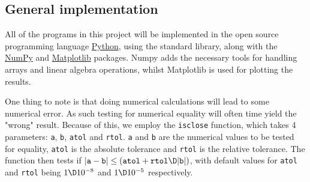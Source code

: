 \documentclass[main.tex]{subfiles}
\begin{document}
	
	
	\subsection{General implementation}
	All of the programs in this project will be implemented in the open source programming language \href{www.python.org}{Python}, using the standard library, along with the \href{www.numpy.org}{NumPy} and \href{www.matplotlib.org}{Matplotlib} packages. Numpy adds the necessary tools for handling arrays and linear algebra operations, whilst Matplotlib is used for plotting the results.
	
	One thing to note is that doing numerical calculations will lead to some numerical error. As such testing for numerical equality will often time yield the "wrong" result. Because of this, we employ the \texttt{isclose} function, which takes 4 parameters: \texttt{a}, \texttt{b}, \texttt{atol} and \texttt{rtol}. \texttt{a} and \texttt{b} are the numerical values to be tested for equality, \texttt{atol} is the absolute tolerance and \texttt{rtol} is the relative tolerance. The function then tests if $|\texttt{a}-\texttt{b}| \leq (\texttt{atol}+ \texttt{rtol} \D |\texttt{b}|)$, with default values for \texttt{atol} and \texttt{rtol} being $ 1 \D 10^{-8} $ and $ 1 \D 10^{-5} $ respectively.
	
	
	
\end{document}
